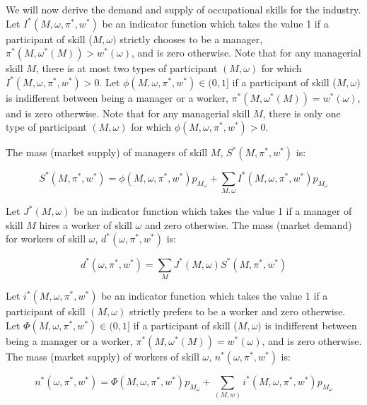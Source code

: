 \documentclass[12 pt]{article}
\begin{document}
We will now derive the demand and supply of occupational skills for the
industry. Let $I^{\ast}(M,\omega,\pi^{\ast},w^{\ast})$ be an indicator
function which takes the value 1 if a participant of skill ($M,\omega)$
strictly chooses to be a manager, $\pi^{\ast}(M,\omega^{\ast}(M))>w^{\ast
}(\omega)$, and is zero otherwise. Note that for any managerial skill $M$,
there is at most two types of participant $(M,\omega)$ for which $I^{\ast
}(M,\omega,\pi^{\ast},w^{\ast})>0$. Let $\phi(M,\omega,\pi^{\ast},w^{\ast}%
)\in(0,1]$ if a participant of skill ($M,\omega)$ is indifferent between being
a manager or a worker, $\pi^{\ast}(M,\omega^{\ast}(M))=w^{\ast}(\omega)$, and
is zero otherwise. Note that for any managerial skill $M$, there is only one
type of participant $(M,\omega)$ for which $\phi(M,\omega,\pi^{\ast},w^{\ast
})>0$.

The mass (market supply) of managers of skill $M$, $S^{\ast}(M,\pi^{\ast
},w^{\ast})$ is:%

\begin{equation}
	S^{\ast}(M,\pi^{\ast},w^{\ast})=\phi(M,\omega,\pi^{\ast},w^{\ast}%
	)p_{M_{\omega}}+\sum_{M,\omega}I^{\ast}(M,\omega,\pi^{\ast},w^{\ast
	})p_{M_{\omega}} \label{supply of managers}%
\end{equation}


Let $J^{\ast}(M,\omega)$ be an indicator function which takes the value 1 if a
manager of skill $M$ hires a worker of skill $\omega$ and zero otherwise. The
mass (market demand) for workers of skill $\omega$, $d^{\ast}(\omega,\pi
^{\ast},w^{\ast})$ is:%

\begin{equation}
	d^{\ast}(\omega,\pi^{\ast},w^{\ast})=\sum_{M}J^{\ast}(M,\omega)S^{\ast}%
	(M,\pi^{\ast},w^{\ast}) \label{demand for workers}%
\end{equation}


Let $i^{\ast}(M,\omega,\pi^{\ast},w^{\ast})$ be an indicator function which
takes the value 1 if a participant of skill $(M,\omega)$ strictly prefers to
be a worker and zero otherwise. Let $\Phi(M,\omega,\pi^{\ast},w^{\ast}%
)\in(0,1]$ if a participant of skill ($M,\omega)$ is indifferent between being
a manager or a worker, $\pi^{\ast}(M,\omega^{\ast}(M))=w^{\ast}(\omega)$, and
is zero otherwise. The mass (market supply) of workers of skill $\omega$,
$n^{\ast}(\omega,\pi^{\ast},w^{\ast})$ is:%

\begin{equation}
	n^{\ast}(\omega,\pi^{\ast},w^{\ast})=\Phi(M,\omega,\pi^{\ast},w^{\ast
	})p_{M_{\omega}}+\sum_{(M,w)}i^{\ast}(M,\omega,\pi^{\ast},w^{\ast
	})p_{M_{\omega}} \label{supply of workers}%
\end{equation}
\end{document}
